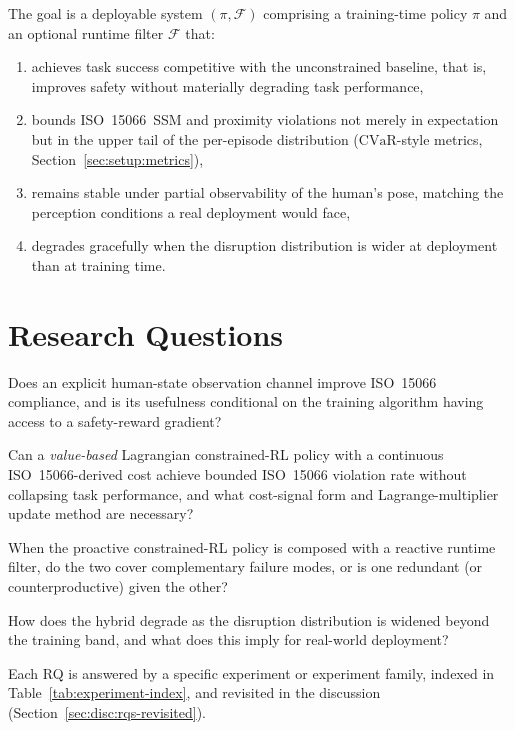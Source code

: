 \documentclass[11pt,a4paper]{report}
\newcommand{\ssm}{SSM}
\newcommand{\iso}{ISO~15066}
\newcommand{\cvar}{\ensuremath{\mathrm{CVaR}}}
\begin{document}
The goal is a deployable system $(\pi, \mathcal{F})$ comprising a
training-time policy $\pi$ and an optional runtime filter
$\mathcal{F}$ that:
\begin{enumerate}[topsep=2pt,itemsep=1pt]
\item achieves task success competitive with the unconstrained
  baseline, that is, improves safety without materially degrading
  task performance,
\item bounds \iso{}~\ssm{} and proximity violations not merely in
  expectation but in the upper tail of the per-episode distribution
  (\cvar{}-style metrics, Section~\ref{sec:setup:metrics}),
\item remains stable under partial observability of the human's pose,
  matching the perception conditions a real deployment would face,
\item degrades gracefully when the disruption distribution is wider
  at deployment than at training time.
\end{enumerate}

\section{Research Questions}
\label{sec:intro:rqs}

\begin{description}[leftmargin=2em,style=nextline]
\item[RQ1] Does an explicit human-state observation channel improve
  \iso{} compliance, and is its usefulness conditional on the
  training algorithm having access to a safety-reward gradient?
\item[RQ2] Can a \emph{value-based} Lagrangian constrained-RL policy
  with a continuous \iso{}-derived cost achieve bounded
  \iso{} violation rate without collapsing task performance, and
  what cost-signal form and Lagrange-multiplier update method are
  necessary?
\item[RQ3] When the proactive constrained-RL policy is composed with
  a reactive runtime filter, do the two cover complementary failure
  modes, or is one redundant (or counterproductive) given the other?
\item[RQ4] How does the hybrid degrade as the disruption
  distribution is widened beyond the training band, and what does
  this imply for real-world deployment?
\end{description}

Each RQ is answered by a specific experiment or experiment family,
indexed in Table~\ref{tab:experiment-index}, and revisited in the
discussion (Section~\ref{sec:disc:rqs-revisited}).
\end{document}
